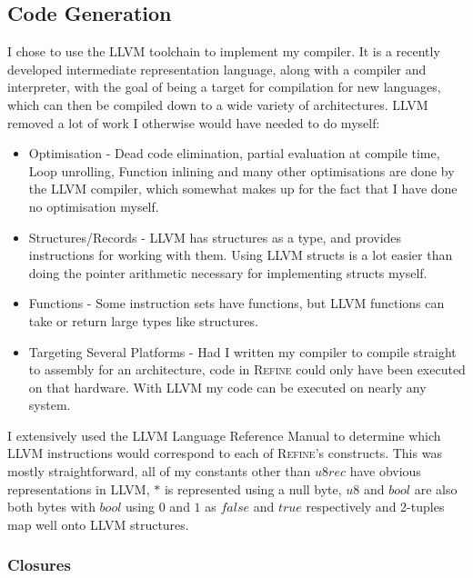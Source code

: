 \subsection{Code Generation}

I chose to use the LLVM toolchain to implement my compiler.
It is a recently developed intermediate representation language, along with a compiler and interpreter,
with the goal of being a target for compilation for new languages, which can then be compiled down to
a wide variety of architectures.
LLVM removed a lot of work I otherwise would have needed to do myself:
\begin{itemize}
    \item Optimisation -
    Dead code elimination,
    partial evaluation at compile time,
    Loop unrolling,
    Function inlining
    and many other optimisations are done by the LLVM compiler, which somewhat makes up for the fact that
    I have done no optimisation myself.
    \item Structures/Records -
    LLVM has structures as a type, and provides instructions for working with them.
    Using LLVM structs is a lot easier than doing the pointer arithmetic necessary for implementing
    structs myself.
    \item Functions -
    Some instruction sets have functions, but LLVM functions can take or return large types like
    structures.
    \item Targeting Several Platforms -
    Had I written my compiler to compile straight to assembly for an architecture, code in \textsc{Refine} could
    only have been executed on that hardware.
    With LLVM my code can be executed on nearly any system.
\end{itemize}
I extensively used the LLVM Language Reference Manual \cite{llvm} to determine which LLVM instructions
would correspond to each of \textsc{Refine}'s constructs.
This was mostly straightforward, all of my constants other than $u8rec$ have obvious representations
in LLVM, $\ast$ is represented using a null byte, $u8$ and $bool$ are also both bytes with $bool$ using
$0$ and $1$ as $false$ and $true$ respectively and 2-tuples map well onto LLVM structures.

\subsubsection{Closures}


